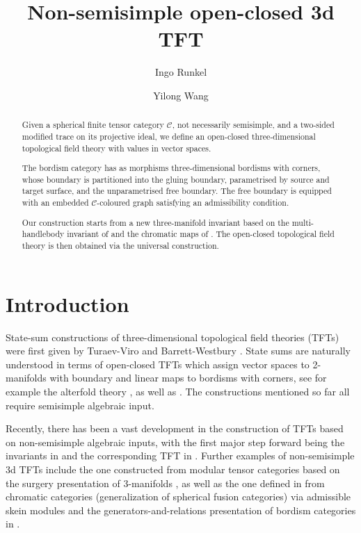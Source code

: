 \documentclass[11pt]{amsart}
\title{Non-semisimple open-closed 3d TFT}
\author{Ingo Runkel}
\author{Yilong Wang}
\theoremstyle{definition}
\numberwithin{equation}{section}
\def\cC{\mathcal{C}}
\begin{document}
\begin{abstract}
Given a spherical finite tensor category $\cC$, not necessarily semisimple, and a two-sided modified trace on its projective ideal, we define an open-closed three-dimensional topological field theory with values in vector spaces. 

The bordism category has as morphisms three-dimensional bordisms with corners, whose boundary is partitioned into the gluing boundary, pa\-ra\-me\-trised by source and target surface, and the unparametrised free boundary. The free boundary is equipped with an embedded $\cC$-coloured graph satisfying an admissibility condition.

Our construction starts from a new three-manifold invariant based on the multi-han\-dle\-bo\-dy invariant of \cite{CGPT20-Kup} and the chromatic maps of \cite{CGPV23}.
The open-closed topological field theory is then obtained via the universal construction.
\end{abstract}

\maketitle

\tableofcontents

\thispagestyle{empty}

\newpage

\section{Introduction}
State-sum constructions of three-dimensional topological field theories (TFTs) were first given by Turaev-Viro \cite{TV92} and Barrett-Westbury \cite{BW95}. State sums are naturally understood in terms of open-closed TFTs which assign vector spaces to 2-manifolds with boundary and linear maps to bordisms with corners, see for example the alterfold theory \cite{atfd1, atfd2, atfd3}, as well as \cite{SS25}. The constructions mentioned so far all require semisimple algebraic input. 

Recently, there has been a vast development in the construction of TFTs based on non-semisimple algebraic inputs, with the first major step forward being the invariants in \cite{CGP14} and the corresponding TFT in \cite{BCGP16}. Further examples of non-semisimple 3d TFTs include the one constructed from modular tensor categories based on the surgery presentation of 3-manifolds \cite{DeRenzi2022}, as well as the one defined in \cite{CGPV23} from chromatic categories (generalization of spherical fusion categories) via admissible skein modules and the generators-and-relations presentation of bordism categories in \cite{Juh18}. 
\end{document}
